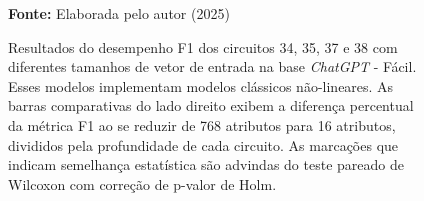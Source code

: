 \begin{figure}
\caption{Resultados do desempenho F1 dos circuitos 34, 35, 37 e 38 com diferentes tamanhos de vetor de entrada na base \textit{ChatGPT} - Fácil. Esses modelos implementam modelos clássicos não-lineares. As barras comparativas do lado direito exibem a diferença percentual da métrica F1 ao se reduzir de 768 atributos para 16 atributos, divididos pela profundidade de cada circuito. As marcações que indicam semelhança estatística são advindas do teste pareado de Wilcoxon com correção de p-valor de Holm.}
\label{fig:n_features:easy:g5}
     \centering
    \centering
      \par\medskip\ABNTEXfontereduzida\selectfont\textbf{Fonte:} Elaborada pelo autor (2025) \par\medskip
\end{figure}